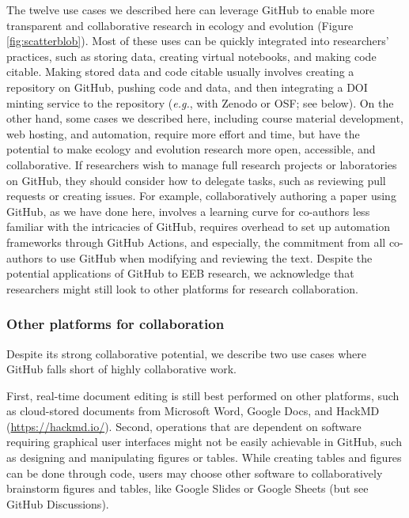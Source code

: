 The twelve use cases we described here can leverage GitHub to enable more transparent and collaborative research in ecology and evolution (Figure \ref{fig:scatterblob}).
Most of these uses can be quickly integrated into researchers' practices, such as storing data, creating virtual notebooks, and making code citable.
Making stored data and code citable usually involves creating a repository on GitHub, pushing code and data, and then integrating a DOI minting service to the repository (\emph{e.g.}, with Zenodo or OSF; see below).
On the other hand, some cases we described here, including course material development, web hosting, and automation, require more effort and time, but have the potential to make ecology and evolution research more open, accessible, and collaborative.
If researchers wish to manage full research projects or laboratories on GitHub, they should consider how to delegate tasks, such as reviewing pull requests or creating issues.
For example, collaboratively authoring a paper using GitHub, as we have done here, involves a learning curve for co-authors less familiar with the intricacies of GitHub, requires overhead to set up automation frameworks through GitHub Actions, and especially, the commitment from all co-authors to use GitHub when modifying and reviewing the text.
Despite the potential applications of GitHub to EEB research, we acknowledge that researchers might still look to other platforms for research collaboration.

\hypertarget{other-platforms-for-collaboration}{%
\subsubsection{Other platforms for collaboration}\label{other-platforms-for-collaboration}}

Despite its strong collaborative potential, we describe two use cases where GitHub falls short of highly collaborative work.

First, real-time document editing is still best performed on other platforms, such as cloud-stored documents from Microsoft Word, Google Docs, and HackMD (\url{https://hackmd.io/}).
Second, operations that are dependent on software requiring graphical user interfaces might not be easily achievable in GitHub, such as designing and manipulating figures or tables.
While creating tables and figures can be done through code, users may choose other software to collaboratively brainstorm figures and tables, like Google Slides or Google Sheets (but see GitHub Discussions).

